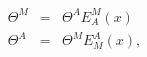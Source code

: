 \begin{equation}
\label{EQP}
\begin{array}{ccc}
\Theta^M & = & \Theta^A E^M_A(x) \\
\Theta^A & = & \Theta^M E^A_M(x),
\end{array}
\end{equation}

